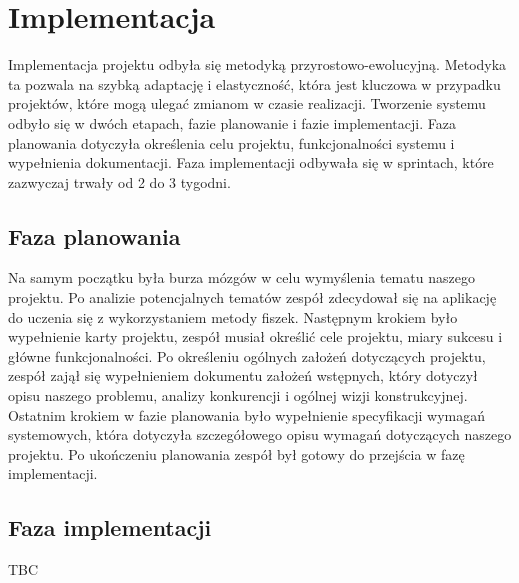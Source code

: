 \chapter{Implementacja}

Implementacja projektu odbyła się metodyką przyrostowo-ewolucyjną. Metodyka ta pozwala na szybką adaptację i elastyczność, która jest kluczowa w przypadku projektów, które mogą ulegać zmianom w czasie realizacji. Tworzenie systemu odbyło się w dwóch etapach, fazie planowanie i fazie implementacji. Faza planowania dotyczyła określenia celu projektu, funkcjonalności systemu i wypełnienia dokumentacji. Faza implementacji odbywała się w sprintach, które zazwyczaj trwały od 2 do 3 tygodni.

\section{Faza planowania}
Na samym początku była burza mózgów w celu wymyślenia tematu naszego projektu. Po analizie potencjalnych tematów zespół zdecydował się na aplikację do uczenia się z wykorzystaniem metody fiszek. Następnym krokiem było wypełnienie karty projektu, zespół musiał określić cele projektu, miary sukcesu i główne funkcjonalności. Po określeniu ogólnych założeń dotyczących projektu, zespół zajął się wypełnieniem dokumentu założeń wstępnych, który dotyczył opisu naszego problemu, analizy konkurencji i ogólnej wizji konstrukcyjnej. Ostatnim krokiem w fazie planowania było wypełnienie specyfikacji wymagań systemowych, która dotyczyła szczegółowego opisu wymagań dotyczących naszego projektu. Po ukończeniu planowania zespół był gotowy do przejścia w fazę implementacji.

\section{Faza implementacji}
TBC